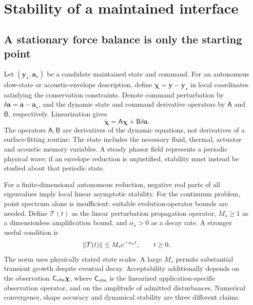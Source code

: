 \section{Stability of a maintained interface}\label{sec:stability}

\subsection{A stationary force balance is only the starting point}
Let $(\bm y_\star,\bm a_\star)$ be a candidate maintained state and command.
For an autonomous slow-state or acoustic-envelope description, define
$\bm\chi=\bm y-\bm y_\star$ in local coordinates satisfying the conservation
constraints. Denote command perturbation by $\delta\bm a=\bm a-\bm a_\star$,
and the dynamic state and command derivative operators by $\mathsf A$ and
$\mathsf B$, respectively. Linearization gives
\begin{equation}
 \dot{\bm\chi}=\mathsf A\bm\chi+\mathsf B\delta\bm a.
 \label{eq:linear-state}
\end{equation}
The operators $\mathsf A,\mathsf B$ are derivatives of the dynamic equations,
not derivatives of a surface-fitting routine. The state includes the necessary
fluid, thermal, actuator and acoustic memory variables. A steady phasor field
represents a periodic physical wave; if an envelope reduction is unjustified,
stability must instead be studied about that periodic state.

For a finite-dimensional autonomous reduction, negative real parts of all
eigenvalues imply local linear asymptotic stability. For the continuum problem,
point spectrum alone is insufficient: suitable evolution-operator bounds are
needed. Define $\mathcal T(t)$ as the linear perturbation propagation operator,
$M_s\geq1$ as a dimensionless amplification bound, and $\alpha_s>0$ as a decay
rate. A stronger useful condition is
\begin{equation}
 \left\lVert\mathcal T(t)\right\rVert\leq M_s e^{-\alpha_s t},\qquad t\geq0.
 \label{eq:semigroup-bound}
\end{equation}
The norm uses physically stated state scales. A large $M_s$ permits substantial
transient growth despite eventual decay. Acceptability additionally
depends on the observation $\mathsf C_{\rm obs}\bm\chi$, where
$\mathsf C_{\rm obs}$ is the linearized application-specific observation operator, and on
the amplitude of admitted disturbances. Numerical convergence, shape accuracy
and dynamical stability are three different claims.

